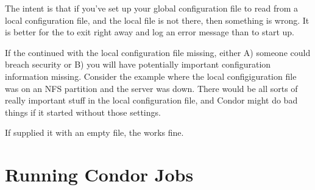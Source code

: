 \begin{description}
The intent is that
if you've set up your global configuration file to read
from a local configuration file, and the local file is not there,
then something is wrong.
It is better for the  to exit right away and
log an error message than to start up.

If the  continued with the local configuration file
missing, either A) someone could breach security or B) you will have
potentially important configuration information missing.
Consider the example where the local configiguration file was on an NFS
partition and the server was down. 
There would be all sorts of
really important stuff in the local configuration file,
and Condor might do bad things if it started without those settings.  

If supplied it with an empty file, the  works fine.

\end{description}


\section{Running Condor Jobs}

